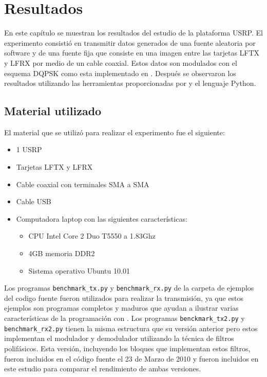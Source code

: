 \chapter{Resultados}

En este cap\'itulo se muestran los resultados del estudio de la plataforma USRP. El experimento
consisti\'o en transmitir datos generados de una fuente aleatoria por software y de una fuente fija
que consiste en una imagen entre las tarjetas LFTX y LFRX por medio de un cable coaxial. Estos
datos son modulados con el esquema DQPSK como esta implementado en \gnuradio. Despu\'es se
observaron los resultados utilizando las herramientas proporcionadas por \gnuradio y el lenguaje Python.

\section{Material utilizado}
El material que se utiliz\'o para realizar el experimento fue el siguiente:

\begin{itemize}
  \item 1 USRP
  \item Tarjetas LFTX y LFRX
  \item Cable coaxial con terminales SMA a SMA
  \item Cable USB
  \item Computadora laptop con las siguientes caracter\'isticas:
  \begin {itemize}
    \item CPU Intel Core 2 Duo T5550 a 1.83Ghz
    \item 4GB memoria DDR2
    \item Sistema operativo Ubuntu 10.01
  \end{itemize}
\end{itemize}

Los programas \verb|benchmark_tx.py| y \verb|benchmark_rx.py| de la carpeta de ejemplos del codigo
fuente fueron utilizados para realizar la transmisi\'on, ya que estos ejemplos son programas
completos y maduros que ayudan a ilustrar varias caracter\'isticas de la programaci\'on con
\gnuradio. Los programas \verb|benckmark_tx2.py| y \verb|benchmark_rx2.py| tienen la misma
estructura que su versi\'on anterior pero estos implementan el modulador y demodulador utilizando la
t\'ecnica de filtros polif\'asicos. Esta versi\'on, incluyendo los bloques que implementan estos
filtros, fueron incluidos en el c\'odigo fuente el 23 de Marzo de 2010 y fueron incluidos en este
estudio para comparar el rendimiento de ambas versiones.


